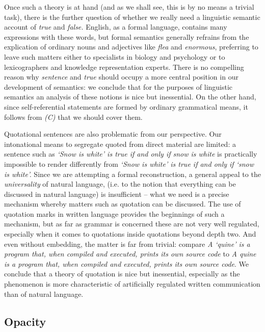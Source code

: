 Once such a theory is at hand (and as we shall see, this is by no means a
trivial task), there is the further question of whether we really need a
linguistic semantic account of {\it true} and {\it false.} English, as a
formal language, contains many expressions with these words, but formal
semantics generally refrains from the explication of ordinary nouns and
adjectives like {\it flea} and {\it enormous}, preferring to leave such
matters either to specialists in biology and psychology or to lexicographers
and knowledge representation experts. There is no compelling reason why {\it
  sentence} and {\it true} should occupy a more central position in our
development of semantics: we conclude that for the purposes of linguistic
semantics an analysis of these notions is nice but inessential. On the other
hand, since self-referential statements are formed by ordinary grammatical
means, it follows from {\sl (C)} that we should cover them.

Quotational sentences are also problematic from our perspective.  Our
intonational means to segregate quoted from direct material are limited: a
sentence such as {\it `Snow is white' is true if and only if snow is white} is
practically impossible to render differently from {\it `Snow is white' is true
if and only if `snow is white'.} Since we are attempting a formal
reconstruction, a general appeal to the {\it universality} of natural
language, (i.e. to the notion that everything can be
discussed in natural language) is insufficient -- what we need is a precise
mechanism whereby matters such as quotation can be discussed. The use of
quotation marks in written language provides the beginnings of such a
mechanism, but as far as grammar is concerned these are not very well
regulated, especially when it comes to quotations inside quotations beyond
depth two. And even without embedding, the matter is far from trivial: compare
{\it A `quine' is a program that, when compiled and executed, prints its own
source code} to {\it A quine is a program that, when compiled and executed,
prints its own source code}.  We conclude that a theory of quotation is nice
but inessential, especially as the phenomenon is more characteristic of
artificially regulated written communication than of natural language. 

\subsection{Opacity}

